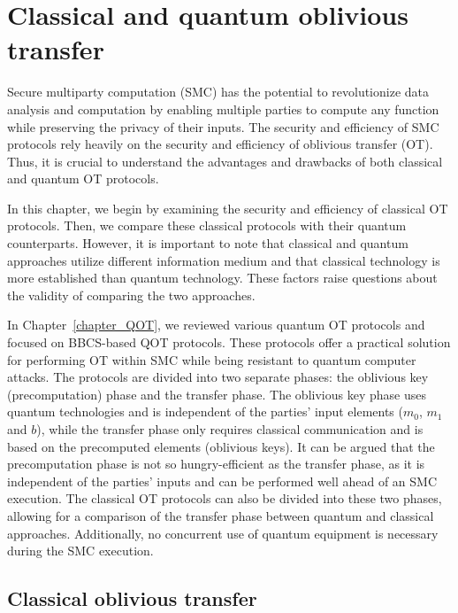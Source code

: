 


%

\chapter{Classical and quantum oblivious transfer}
\label{classical-and-quantum-OT}



Secure multiparty computation (SMC) has the potential to revolutionize data analysis and computation by enabling multiple parties to compute any function while preserving the privacy of their inputs. The security and efficiency of SMC protocols rely heavily on the security and efficiency of oblivious transfer (OT). Thus, it is crucial to understand the advantages and drawbacks of both classical and quantum OT protocols.

In this chapter, we begin by examining the security and efficiency of classical OT protocols. Then, we compare these classical protocols with their quantum counterparts. However, it is important to note that classical and quantum approaches utilize different information medium and that classical technology is more established than quantum technology. These factors raise questions about the validity of comparing the two approaches.

In Chapter~\ref{chapter_QOT}, we reviewed various quantum OT protocols and focused on BBCS-based QOT protocols. These protocols offer a practical solution for performing OT within SMC while being resistant to quantum computer attacks. The protocols are divided into two separate phases: the oblivious key (precomputation) phase and the transfer phase. The oblivious key phase uses quantum technologies and is independent of the parties' input elements ($m_0$, $m_1$ and $b$), while the transfer phase only requires classical communication and is based on the precomputed elements (oblivious keys). It can be argued that the precomputation phase is not so hungry-efficient as the transfer phase, as it is independent of the parties' inputs and can be performed well ahead of an SMC execution. The classical OT protocols can also be divided into these two phases, allowing for a comparison of the transfer phase between quantum and classical approaches. Additionally, no concurrent use of quantum equipment is necessary during the SMC execution.




\section{Classical oblivious transfer}\label{Classical-OT}


